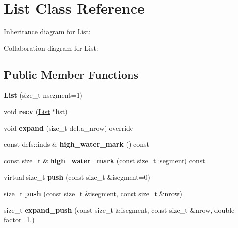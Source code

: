 \hypertarget{classList}{}\section{List Class Reference}
\label{classList}


Inheritance diagram for List\+:


Collaboration diagram for List\+:
\subsection*{Public Member Functions}
\begin{DoxyCompactItemize}
\item 
{\bfseries List} (size\+\_\+t nsegment=1)\hypertarget{classList_ad9a7f3e86dcdbca777ca841110f9b182}{}\label{classList_ad9a7f3e86dcdbca777ca841110f9b182}

\item 
void {\bfseries recv} (\hyperlink{classList}{List} $\ast$list)\hypertarget{classList_af9a90033ed5f37c86b10817d5f806aa8}{}\label{classList_af9a90033ed5f37c86b10817d5f806aa8}

\item 
void {\bfseries expand} (size\+\_\+t delta\+\_\+nrow) override\hypertarget{classList_ab7219d2e334446d8d9cf04d435c4a536}{}\label{classList_ab7219d2e334446d8d9cf04d435c4a536}

\item 
const defs\+::inds \& {\bfseries high\+\_\+water\+\_\+mark} () const \hypertarget{classList_a71aac8cca374b0a9d02b0b6646a682e6}{}\label{classList_a71aac8cca374b0a9d02b0b6646a682e6}

\item 
const size\+\_\+t \& {\bfseries high\+\_\+water\+\_\+mark} (const size\+\_\+t isegment) const \hypertarget{classList_aeb70d73014daa57c9e1e4521fbe92cc9}{}\label{classList_aeb70d73014daa57c9e1e4521fbe92cc9}

\item 
virtual size\+\_\+t {\bfseries push} (const size\+\_\+t \&isegment=0)\hypertarget{classList_a7b210981cf2d5fc3fa98ffcd60a20e19}{}\label{classList_a7b210981cf2d5fc3fa98ffcd60a20e19}

\item 
size\+\_\+t {\bfseries push} (const size\+\_\+t \&isegment, const size\+\_\+t \&nrow)\hypertarget{classList_a99ed396caa739a7cc372442c88c7aa3b}{}\label{classList_a99ed396caa739a7cc372442c88c7aa3b}

\item 
size\+\_\+t {\bfseries expand\+\_\+push} (const size\+\_\+t \&isegment, const size\+\_\+t \&nrow, double factor=1.)\hypertarget{classList_af3e8a3d6bf6364cb9f7c57bd87e110d0}{}\label{classList_af3e8a3d6bf6364cb9f7c57bd87e110d0}


\end{DoxyCompactItemize}

